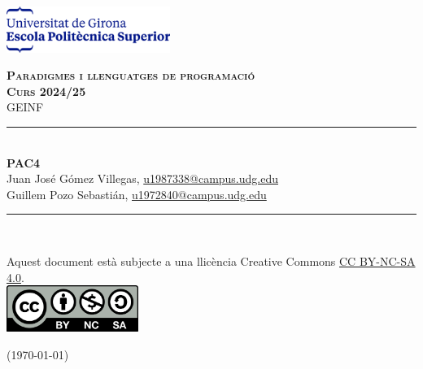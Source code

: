 \documentclass[10pt,a4paper]{article}
\begin{document}
    \begin{titlepage}
        \newcommand{\HRule}{\rule{\linewidth}{0.5mm}} %
        \begin{flushleft}
            \includegraphics[height=1.5cm]{EPS.png}\\\vfill
        \end{flushleft}
        \center %
        \textsc{\huge \bfseries Paradigmes i llenguatges de programació }\\[0.25cm]
        \textsc{\Large \bfseries Curs 2024/25}\\[0.25cm]
        \textsc{\large GEINF }
        \HRule \\[0.4cm]
        { \huge \bfseries PAC4} \\[0.4cm] %
{Juan José Gómez Villegas, \href{mailto:u1987338@campus.udg.edu}{u1987338@campus.udg.edu}} \\ {Guillem Pozo Sebastián, \href{mailto:u1972840@campus.udg.edu}{u1972840@campus.udg.edu}}
        \HRule \\\vfill
        \begin{minipage}{0.4\textwidth}
            \begin{flushleft}
		\footnotesize{Aquest document està subjecte a una llicència Creative Commons \href{https://creativecommons.org/licenses/by-nc-sa/4.0/?ref=chooser-v1}{CC BY-NC-SA 4.0}.} \\\vfill
		\includegraphics[height=1.5cm]{CC_license.png}
            \end{flushleft}
        \end{minipage}
        \hfill
        \begin{minipage}{0.4\textwidth}
            \begin{flushright} \large
                {\small (\today)}
            \end{flushright}
        \end{minipage}
    \end{titlepage}
\end{document}
